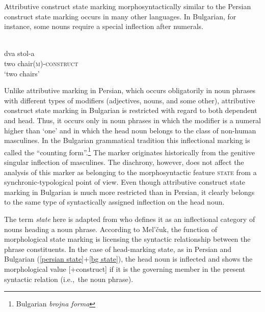 Attributive construct state marking morphosyntactically similar to the Persian construct state marking occurs in many other languages. In Bulgarian, for instance, some nouns require a special inflection after numerals.
\begin{exe}
\ex 
{}\\
\label{bg state}
\gll 	dva 	stol-a\\
	two	chair{\textsc{(m)-construct}}\\
\glt 	‘two chairs’
\end{exe}
Unlike attributive  marking in Persian, which occurs obligatorily in noun phrases with different types of modifiers (adjectives, nouns, and some other), attributive construct state marking in Bulgarian is restricted with regard to both dependent and head. Thus, it occurs only in noun phrases in which the modifier is a numeral higher than ‘one’ and in which the head noun belongs to the class of non-human masculines. In the Bulgarian grammatical tradition this inflectional marking is called the “counting form”.\footnote{Bulgarian \emph{brojna forma}} The marker originates historically from the genitive singular inflection of masculines. The diachrony, however, does not affect the analysis of this marker as belonging to the morphosyntactic feature \textsc{state} from a synchronic-typological point of view. Even though attributive construct state marking in Bulgarian is much more restricted than in Persian, it clearly belongs to the same type of syntactically assigned inflection on the head noun.

The term \emph{state} here is adapted from \citet[114–116]{melcuk2006} who defines it as an inflectional category of nouns heading a noun phrase. According to Mel'čuk, the function of morphological state marking is licensing the syntactic relationship between the phrase constituents. In the case of head-marking state, as in Persian and Bulgarian (\ref{persian state}+\ref{bg state}), the head noun is inflected and shows the morphological value [+construct] if it is the governing member in the present syntactic relation (i.e.,~the noun phrase). 

